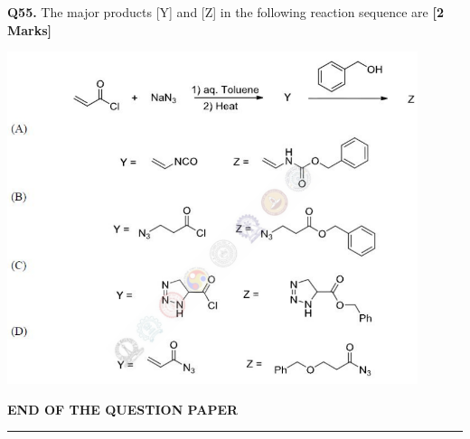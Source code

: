 \documentclass[11pt]{article}
\newcommand{\questionb}[2]{
    \noindent\textbf{Q#2.} #1 \hfill \textbf{[2 Marks]}
}
\begin{document}
\questionb{The major products [Y] and [Z] in the following reaction sequence are}{55}
\begin{center}
\includegraphics[width=0.9\textwidth]{figures/55.png}
\end{center}

\vspace{0.5cm}



\vspace{5cm}
\begin{center}
\textbf{END OF THE QUESTION PAPER} \\
\rule{\textwidth}{0.5pt} 
\end{center}
\end{document}
